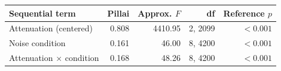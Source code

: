 \begin{tabular}{lrrrr}
\toprule
Sequential term & Pillai & Approx. $F$ & df & Reference $p$ \\
\midrule
Attenuation (centered) & 0.808 & 4410.95 & 2, 2099 & $<0.001$ \\
Noise condition & 0.161 & 46.00 & 8, 4200 & $<0.001$ \\
Attenuation $\times$ condition & 0.168 & 48.26 & 8, 4200 & $<0.001$ \\
\bottomrule
\end{tabular}
